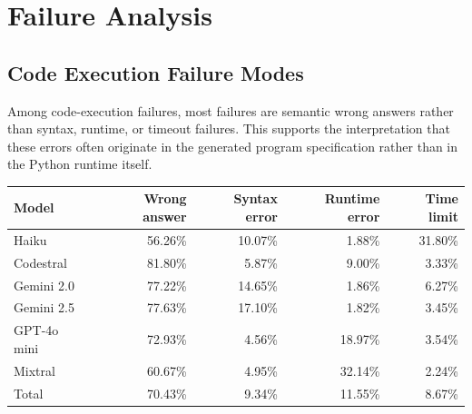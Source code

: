 
\clearpage
\section{Failure Analysis}
\label{app:failure_analysis}

\subsection{Code Execution Failure Modes}
\label{app:code_execution_failure_modes}

Among \RouteThree{} code-execution failures, most failures are semantic wrong
answers rather than syntax, runtime, or timeout failures. This supports the interpretation
that these errors often originate in the generated program specification rather
than in the Python runtime itself.

\begin{appendixtableblock}
\small
\begin{tabular*}{\linewidth}{@{\extracolsep{\fill}}lrrrr@{}}
\toprule
Model & Wrong answer & Syntax error & Runtime error & Time limit \\
\midrule
Haiku & 56.26\% & 10.07\% & 1.88\% & 31.80\% \\
Codestral & 81.80\% & 5.87\% & 9.00\% & 3.33\% \\
Gemini 2.0 & 77.22\% & 14.65\% & 1.86\% & 6.27\% \\
Gemini 2.5 & 77.63\% & 17.10\% & 1.82\% & 3.45\% \\
GPT-4o mini & 72.93\% & 4.56\% & 18.97\% & 3.54\% \\
Mixtral & 60.67\% & 4.95\% & 32.14\% & 2.24\% \\
Total & 70.43\% & 9.34\% & 11.55\% & 8.67\% \\
\bottomrule
\end{tabular*}
\label{tab:appendix_code_failure_modes}
\end{appendixtableblock}

